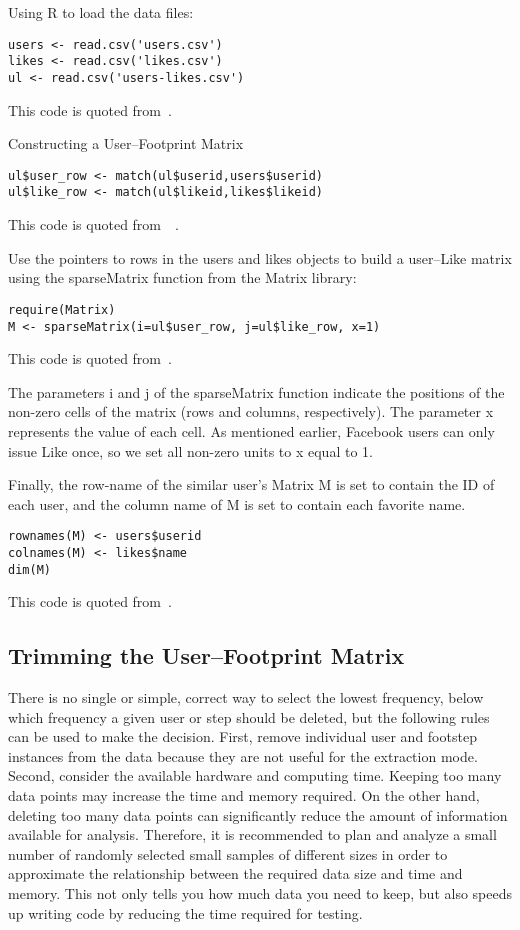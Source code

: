 Using R to load the data files:

\begin{verbatim}
users <- read.csv('users.csv')
likes <- read.csv('likes.csv')
ul <- read.csv('users-likes.csv')
\end{verbatim}

This code is quoted from~\cite{editor12}.

Constructing a User–Footprint Matrix

\begin{verbatim}
ul$user_row <- match(ul$userid,users$userid)
ul$like_row <- match(ul$likeid,likes$likeid)
\end{verbatim}

This code is quoted from~~\cite{editor12}.

Use the pointers to rows in the users and likes objects to build 
a user–Like matrix using the sparseMatrix function from the Matrix
 library:

\begin{verbatim}
require(Matrix)
M <- sparseMatrix(i=ul$user_row, j=ul$like_row, x=1)
\end{verbatim}

This code is quoted from~\cite{editor12}.

The parameters i and j of the sparseMatrix function indicate the 
positions of the non-zero cells of the matrix (rows and columns, 
respectively). The parameter x represents the value of each cell. 
As mentioned earlier, Facebook users can only issue Like once, so 
we set all non-zero units to x equal to 1.

Finally, the row-name of the similar user's Matrix M is set to 
contain the ID of each user, and the column name of M is set to 
contain each favorite name.

\begin{verbatim}
rownames(M) <- users$userid
colnames(M) <- likes$name
dim(M)
\end{verbatim}

This code is quoted from~\cite{editor12}.

\subsection{Trimming the User–Footprint Matrix}

There is no single or simple, correct way to select the lowest 
frequency, below which frequency a given user or step should be 
deleted, but the following rules can be used to make the decision.
 First, remove individual user and footstep instances from the 
data because they are not useful for the extraction mode. Second, 
consider the available hardware and computing time. Keeping too 
many data points may increase the time and memory required. On the
 other hand, deleting too many data points can significantly reduce
 the amount of information available for analysis. Therefore, it is
 recommended to plan and analyze a small number of randomly 
selected small samples of different sizes in order to approximate 
the relationship between the required data size and time and 
memory. This not only tells you how much data you need to keep, 
but also speeds up writing code by reducing the time required for 
testing.

